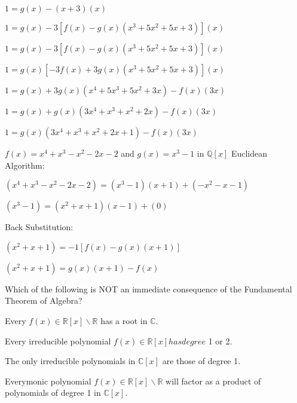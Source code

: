 \documentclass[12pt]{article}
\newcommand{\R}{\mathbb{R}}
\newcommand{\Q}{\mathbb{Q}}
\newcommand{\C}{\mathbb{C}}
\newenvironment{question}[2][Question]{\begin{trivlist}
\item[\hskip \labelsep {\bfseries #1}\hskip \labelsep {\bfseries #2.}]}{\end{trivlist}}
\begin{document}
\begin{question}{1}
\begin{question}{1b}
$1 = g(x) - (x + 3)(x)$

$1 = g(x) - 3[f(x) - g(x)(x^3 + 5x^2 + 5x + 3)](x)$

$1 = g(x) - 3[f(x) - g(x)(x^3 + 5x^2 + 5x + 3)](x)$

$1 = g(x)[-3f(x) +3g(x)(x^3 + 5x^2 + 5x + 3)](x)$

$1 = g(x)+3g(x)(x^4 + 5x^3 + 5x^2 + 3x)-f(x)(3x)$

$1 = g(x)+g(x)(3x^4 + x^3 + x^2 + 2x)-f(x)(3x)$

$1 = g(x)(3x^4 + x^3 + x^2 + 2x+1)-f(x)(3x)$

\end{question}

\begin{question}{1c}$f(x) = x^4 + x^3 - x^2 - 2x - 2$ and $g(x) = x^3 - 1$ in $\Q[x]$
Euclidean Algorithm:

$(x^4 + x^3 - x^2 - 2x - 2) = (x^3 - 1)(x + 1) + (-x^2 - x - 1)$ %

$(x^3 - 1) = (x^2 + x + 1)(x - 1) + (0)$

Back Substitution:

$(x^2 + x + 1) = -1[f(x) - g(x)(x + 1)]$

$(x^2 + x + 1) = g(x)(x + 1)-f(x)$

\end{question}

\end{question}
\begin{question}{2}
Which of the following is NOT an immediate consequence of the Fundamental Theorem
of Algebra?

\begin{question}{2a} Every $f(x) \in \R[x] \backslash \R$ has a root in $\C$.
\end{question}
\begin{question}{2b} Every irreducible polynomial $f(x) \in \R[x] has degree$ 1 or 2.
\end{question}
\begin{question}{2c} The only irreducible polynomials in $\C[x]$ are those of degree 1.
\end{question}
\begin{question}{2d} Everymonic polynomial $f(x) \in \R[x] \backslash \R$ will factor as a product of polynomials of degree 1 in $\C[x]$.
\end{question}

\end{question}
\end{document}
